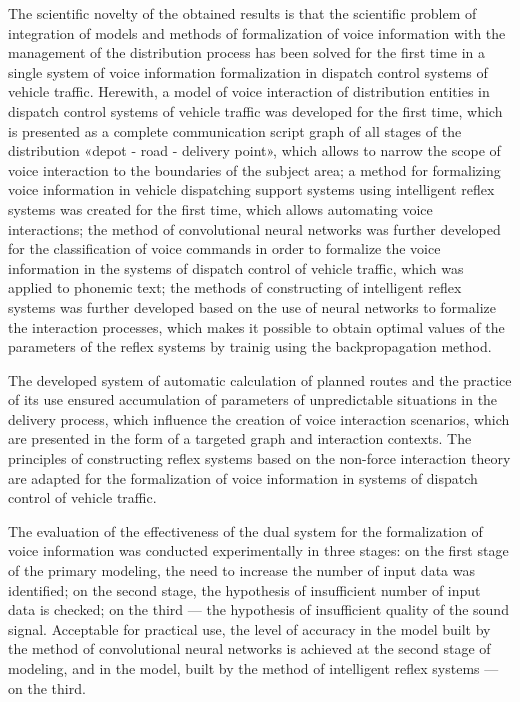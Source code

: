 The scientific novelty of the obtained results is that the scientific problem of integration of models and methods of formalization of voice information with the management of the distribution process has been solved for the first time in a single system of voice information formalization in dispatch control systems of vehicle traffic. Herewith, a model of voice interaction of distribution entities in dispatch control systems of vehicle traffic was developed for the first time, which is presented as a complete communication script graph of all stages of the distribution «depot - road - delivery point», which allows to narrow the scope of voice interaction to the boundaries of the subject area; a method for formalizing voice information in vehicle dispatching support systems using intelligent reflex systems was created for the first time, which allows automating voice interactions; the method of convolutional neural networks was further developed for the classification of voice commands in order to formalize the voice information in the systems of dispatch control of vehicle traffic, which was applied to phonemic text; the methods of constructing of intelligent reflex systems was further developed based on the use of neural networks to formalize the interaction processes, which makes it possible to obtain optimal values of the parameters of the reflex systems by trainig using the backpropagation method.

The developed system of automatic calculation of planned routes and the practice of its use ensured accumulation of parameters of unpredictable situations in the delivery process, which influence the creation of voice interaction scenarios, which are presented in the form of a targeted graph and interaction contexts.
The principles of constructing reflex systems based on the non-force interaction theory are adapted for the formalization of voice information in systems of dispatch control of vehicle traffic.

The evaluation of the effectiveness of the dual system for the formalization of voice information was conducted experimentally in three stages: on the first stage of the primary modeling, the need to increase the number of input data was identified; on the second stage, the hypothesis of insufficient number of input data is checked; on the third --- the hypothesis of insufficient quality of the sound signal. Acceptable for practical use, the level of accuracy in the model built by the method of convolutional neural networks is achieved at the second stage of modeling, and in the model, built by the method of intelligent reflex systems --- on the third.

